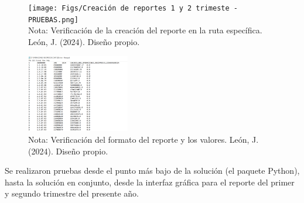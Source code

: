 \documentclass[letter,oneside,12pt,spanish]{report}
\begin{document}
\begin{figure}[ht]
    \centering
    \texttt{[image: Figs/Creación de reportes 1 y 2 trimeste - PRUEBAS.png]}
    \label{fig:ReportInPath}
    \\Nota: Verificación de la creación del reporte en la ruta específica. León, J. (2024). Diseño propio.
\end{figure}   

\begin{figure}[ht]
    \centering
    \includegraphics[width=0.4\textwidth]{Figs/reporte segundo trimestre.png}
    \label{fig:ReportTest}
    \\Nota: Verificación del formato del reporte y los valores. León, J. (2024). Diseño propio.
\end{figure}   



\noindent Se realizaron pruebas desde el punto más bajo de la solución (el paquete Python), hasta la solución en conjunto, desde la interfaz gráfica para el reporte del primer y segundo trimestre del presente año.
\end{document}

